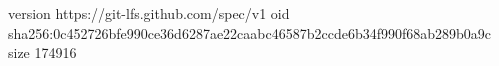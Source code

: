 version https://git-lfs.github.com/spec/v1
oid sha256:0c452726bfe990ce36d6287ae22caabc46587b2ccde6b34f990f68ab289b0a9c
size 174916
